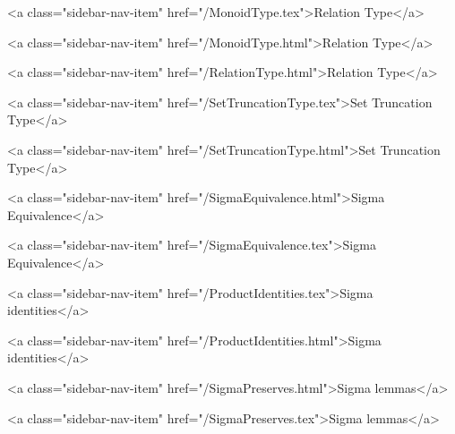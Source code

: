       
    
      
        
          <a class="sidebar-nav-item" href="/MonoidType.tex">Relation Type</a>
        
      
    
      
        
          <a class="sidebar-nav-item" href="/MonoidType.html">Relation Type</a>
        
      
    
      
        
          <a class="sidebar-nav-item" href="/RelationType.html">Relation Type</a>
        
      
    
      
        
          <a class="sidebar-nav-item" href="/SetTruncationType.tex">Set Truncation Type</a>
        
      
    
      
        
          <a class="sidebar-nav-item" href="/SetTruncationType.html">Set Truncation Type</a>
        
      
    
      
        
          <a class="sidebar-nav-item" href="/SigmaEquivalence.html">Sigma Equivalence</a>
        
      
    
      
        
          <a class="sidebar-nav-item" href="/SigmaEquivalence.tex">Sigma Equivalence</a>
        
      
    
      
        
          <a class="sidebar-nav-item" href="/ProductIdentities.tex">Sigma identities</a>
        
      
    
      
        
          <a class="sidebar-nav-item" href="/ProductIdentities.html">Sigma identities</a>
        
      
    
      
        
          <a class="sidebar-nav-item" href="/SigmaPreserves.html">Sigma lemmas</a>
        
      
    
      
        
          <a class="sidebar-nav-item" href="/SigmaPreserves.tex">Sigma lemmas</a>
        

